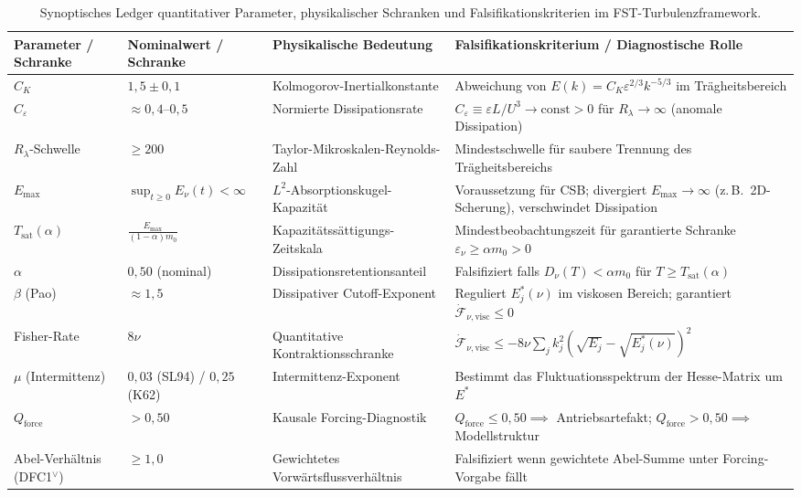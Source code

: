 \documentclass[12pt,a4paper]{article}
\theoremstyle{breakdef}
\theoremstyle{breakplain}
\theoremstyle{breakdef}
\begin{document}
\begin{table}[htbp]
\centering
\footnotesize
\caption{Synoptisches Ledger quantitativer Parameter, physikalischer Schranken und Falsifikationskriterien im FST-Turbulenzframework.}
\label{tab:parameter-thresholds}
\vspace{4pt}
\setlength{\tabcolsep}{3.5pt}
\renewcommand{\arraystretch}{1.15}
\begin{tabularx}{\textwidth}{>{\raggedright\arraybackslash}p{2.0cm} >{\centering\arraybackslash}p{2.5cm} >{\raggedright\arraybackslash}p{3.5cm} Y}
\toprule
\textbf{Parameter / Schranke} & \textbf{Nominalwert / Schranke} & \textbf{Physikalische Bedeutung} & \textbf{Falsifikationskriterium / Diagnostische Rolle} \\
\midrule
$C_K$ & $1{,}5 \pm 0{,}1$ & Kolmogorov-Inertialkonstante & Abweichung von $E(k) = C_K \varepsilon^{2/3} k^{-5/3}$ im Trägheitsbereich \\
\addlinespace[2pt]
$C_\varepsilon$ & $\approx 0{,}4$--$0{,}5$ & Normierte Dissipationsrate & $C_\varepsilon \equiv \varepsilon L / U^3 \to \mathrm{const} > 0$ für $R_\lambda \to \infty$ (anomale Dissipation) \\
\addlinespace[2pt]
$R_\lambda$-Schwelle & $\ge 200$ & Taylor-Mikroskalen-Reynolds-Zahl & Mindestschwelle für saubere Trennung des Trägheitsbereichs \\
\addlinespace[2pt]
$E_{\max}$ & $\sup_{t \ge 0} E_\nu(t) < \infty$ & $L^2$-Absorptionskugel-Kapazität & Voraussetzung für CSB; divergiert $E_{\max} \to \infty$ (z.\,B.\ 2D-Scherung), verschwindet Dissipation \\
\addlinespace[2pt]
$T_{\mathrm{sat}}(\alpha)$ & $\frac{E_{\max}}{(1-\alpha)m_0}$ & Kapazitäts\-sättigungs-Zeitskala & Mindestbeobachtungszeit für garantierte Schranke $\varepsilon_\nu \ge \alpha m_0 > 0$ \\
\addlinespace[2pt]
$\alpha$ & $0{,}50$ (nominal) & Dissipations\-retentions\-anteil & Falsifiziert falls $D_\nu(T) < \alpha m_0$ für $T \ge T_{\mathrm{sat}}(\alpha)$ \\
\addlinespace[2pt]
$\beta$ (Pao) & $\approx 1{,}5$ & Dissipativer Cutoff-Exponent & Reguliert $E_j^*(\nu)$ im viskosen Bereich; garantiert $\dot{\mathcal{F}}_{\nu,\mathrm{visc}} \le 0$ \\
\addlinespace[2pt]
Fisher-Rate & $8\nu$ & Quantitative Kontraktionsschranke & $\dot{\mathcal{F}}_{\nu,\mathrm{visc}} \le -8\nu \sum_j k_j^2 (\sqrt{E_j} - \sqrt{E_j^*(\nu)})^2$ \\
\addlinespace[2pt]
$\mu$ (Intermittenz) & $0{,}03$ (SL94) / $0{,}25$ (K62) & Intermittenz-Exponent & Bestimmt das Fluktuationsspektrum der Hesse-Matrix um $E^*$ \\
\addlinespace[2pt]
$Q_{\mathrm{force}}$ & $> 0{,}50$ & Kausale Forcing-Diagnostik & $Q_{\mathrm{force}} \le 0{,}50 \implies$ Antriebsartefakt; $Q_{\mathrm{force}} > 0{,}50 \implies$ Modellstruktur \\
\addlinespace[2pt]
Abel-Verhältnis (DFC1$^\vee$) & $\ge 1{,}0$ & Gewichtetes Vorwärtsflussverhältnis & Falsifiziert wenn gewichtete Abel-Summe unter Forcing-Vorgabe fällt \\
\bottomrule
\end{tabularx}
\end{table}
\end{document}
